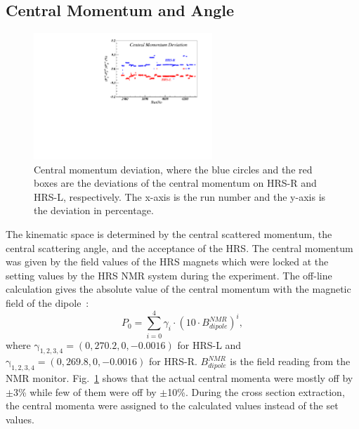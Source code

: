 \subsection{Central Momentum and Angle}
\begin{figure}[!ht]
  \begin{center}
    \includegraphics[type=pdf, ext=.pdf,read=.pdf,width=0.60\textwidth]{./figures/xs/point_mom}
    \caption[Central momentum deviation]{\footnotesize{Central momentum deviation, where the blue circles and the red boxes are the deviations of the central momentum on HRS-R and HRS-L, respectively. The x-axis is the run number and the y-axis is the deviation in percentage.}}
    \label{point_mom}
  \end{center}
\end{figure}
The kinematic space is determined by the central scattered momentum, the central scattering angle, and the acceptance of the HRS. The central momentum was given by the field values of the HRS magnets which were locked at the setting values by the HRS NMR system during the experiment. The off-line calculation gives the absolute value of the central momentum with the magnetic field of the dipole~\cite{halla_nim}:
\begin{equation}
 P_{0} = \sum_{i=0}^{4} \gamma_{i} \cdot \left( 10\cdot B^{NMR}_{dipole} \right)^{i},
\end{equation}
where $\mathrm{\gamma_{1,2,3,4}=(0, 270.2, 0, -0.0016)}$ for HRS-L and  $\mathrm{\gamma_{1,2,3,4}=(0, 269.8, 0, -0.0016)}$ for HRS-R. $B^{NMR}_{dipole}$ is the field reading from the NMR monitor. Fig.~\ref{point_mom} shows that the actual central momenta were mostly off by $\pm$3\% while few of them were off by $\pm$10\%. During the cross section extraction, the central momenta were assigned to the calculated values instead of the set values.

